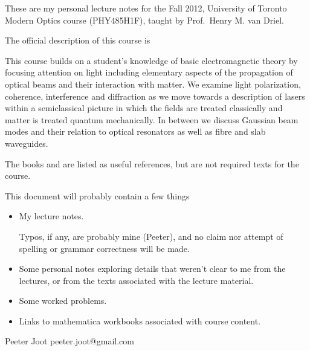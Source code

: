 These are my personal lecture notes for the Fall 2012, University of Toronto Modern Optics course (PHY485H1F), taught by Prof.\ Henry M. van Driel.

The official description of this course is

This course builds on a student's knowledge of basic electromagnetic theory by focusing attention on light including elementary aspects of the propagation of optical beams and their interaction with matter.  We examine light polarization, coherence, interference and diffraction as we move towards a description of lasers within a semiclassical picture in which the fields are treated classically and matter is treated quantum mechanically.  In between we discuss Gaussian beam modes and their relation to optical resonators as well as fibre and slab waveguides.

The books \cite{hecht2002optics} and \cite{saleh1991fundamentals} are listed as useful references, but are not required texts for the course. 

This document will probably contain a few things

\begin{itemize}
\item My lecture notes.

Typos, if any, are probably mine (Peeter), and no claim nor attempt of spelling or grammar correctness will be made.

\item Some personal notes exploring details that weren't clear to me from the lectures, or from the texts associated with the lecture material.

\item Some worked problems.

\item Links to mathematica workbooks associated with course content.

\end{itemize}

Peeter Joot  \quad peeter.joot@gmail.com 

